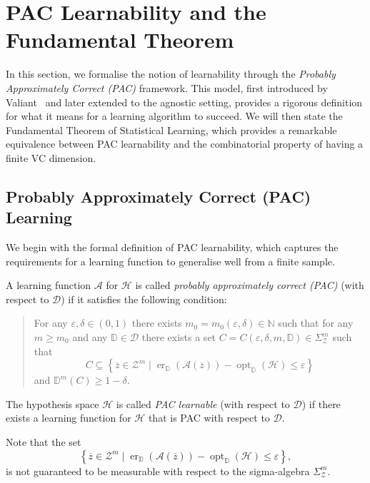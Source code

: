 \section{PAC Learnability and the Fundamental Theorem}

In this section, we formalise the notion of learnability through the \emph{Probably Approximately Correct (PAC)} framework. This model, first introduced by Valiant~\cite{Valiant1984} and later extended to the agnostic setting, provides a rigorous definition for what it means for a learning algorithm to succeed. We will then state the Fundamental Theorem of Statistical Learning, which provides a remarkable equivalence between PAC learnability and the combinatorial property of having a finite VC dimension.

\subsection{Probably Approximately Correct (PAC) Learning}

We begin with the formal definition of PAC learnability, which captures the requirements for a learning function to generalise well from a finite sample.

\begin{definition}
    \label{def:pac-learnability}
    A learning function $\mathcal{A}$ for $\mathcal{H}$ is called \emph{probably approximately correct (PAC)} (with respect to $\mathcal{D}$) if it satisfies the following condition:
    \begin{quote}
        For any $\varepsilon, \delta \in (0,1)$ there exists $m_0 = m_0(\varepsilon, \delta) \in \mathbb{N}$ such that for any $m \ge m_0$ and any $\mathbb{D} \in \mathcal{D}$ there exists a set $C = C(\varepsilon, \delta, m, \mathbb{D}) \in \Sigma_{\mathcal{Z}}^m$ such that
        \[
            C \subseteq \left\{ \overline{z} \in \mathcal{Z}^m \mid \operatorname{er}_{\mathbb{D}}(\mathcal{A}(\overline{z})) - \operatorname{opt}_{\mathbb{D}}(\mathcal{H}) \le \varepsilon \right\}
        \]
        and $\mathbb{D}^m(C) \ge 1 - \delta$.
    \end{quote}
    The hypothesis space $\mathcal{H}$ is called \emph{PAC learnable} (with respect to $\mathcal{D}$) if there exists a learning function for $\mathcal{H}$ that is PAC with respect to $\mathcal{D}$.
\end{definition}

\begin{remark}
    Note that the set
    \[
        \left\{ \overline{z} \in \mathcal{Z}^m \mid \operatorname{er}_{\mathbb{D}}(\mathcal{A}(\overline{z})) - \operatorname{opt}_{\mathbb{D}}(\mathcal{H}) \le \varepsilon \right\},
    \]
    is not guaranteed to be measurable with respect to the sigma-algebra $\Sigma_{\mathcal{Z}}^m$.
\end{remark}

